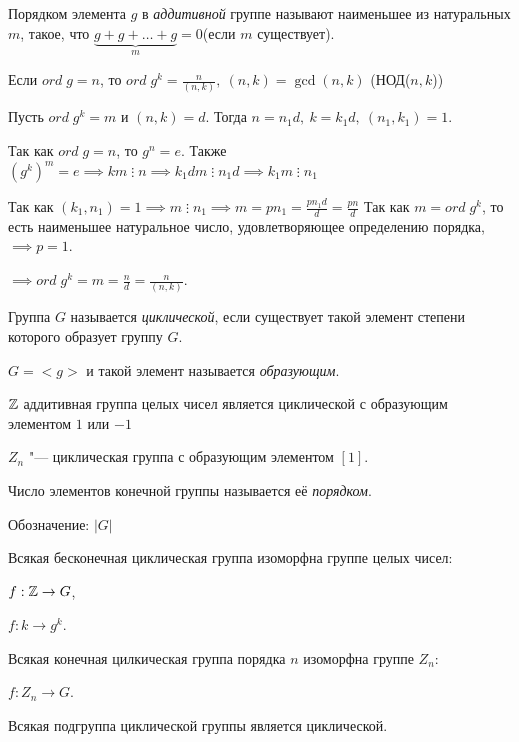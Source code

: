 Порядком элемента $g$ в \textit{аддитивной} группе называют наименьшее из натуральных $m$, такое, что $\underbrace{g+g+\ldots+g}_m = 0$(если $m$ существует).
\begin{theorem}
  Если $ord\;g = n$, то $ord\;g^k = \frac{n}{(n,k)},~(n,k) = \gcd(n,k)$ (НОД($n,k$))
\end{theorem}
\begin{Proof}
  Пусть $ord\;g^k = m$ и $(n,k) = d$. Тогда $n = n_1d,~ k = k_1d, ~(n_1,k_1) =1$.

  Так как $ord\;g = n$, то $g^n = e$. Также $(g^k)^m = e \implies km\;\vdots\;n \implies k_1dm\;\vdots \; n_1d \implies k_1m \;\vdots\; n_1$
  
  Так как $(k_1,n_1) = 1 \implies m\;\vdots\;n_1 \implies m = pn_1 = \frac{pn_1d}{d} = \frac{pn}{d}$ Так как $m = ord\; g^k$, то есть наименьшее натуральное число, удовлетворяющее определению порядка, $\implies p = 1$.

  $\implies ord\;g^k = m = \frac{n}{d} = \frac{n}{(n,k)}$.
\end{Proof}

\begin{definition}
  Группа $G$ называется \textit{циклической}, если существует такой элемент степени которого образует группу $G$. 
  
  $G = <\!g\!>$ и такой элемент называется \textit{образующим}.
\end{definition}

\begin{example}
  $\mathbb{Z}$ аддитивная группа целых чисел является циклической с образующим элементом $1$ или $-1$

  $Z_n$ "--- циклическая группа с образующим элементом $[1]$.
\end{example}

\begin{definition}
  Число элементов конечной группы называется её \textit{порядком}.

  Обозначение: $\mathopen|G\mathclose|$
\end{definition}
\begin{example}
  Всякая бесконечная циклическая группа изоморфна группе целых чисел:

  $f: \mathbb{Z} \to G$,

  $f: k \to g^k$.

  Всякая конечная цилкическая группа порядка $n$ изоморфна группе $Z_n$:

  $f: Z_n \to G$.

  
\end{example}
\begin{theorem}
  Всякая подгруппа циклической группы является циклической. 
  
\end{theorem}

